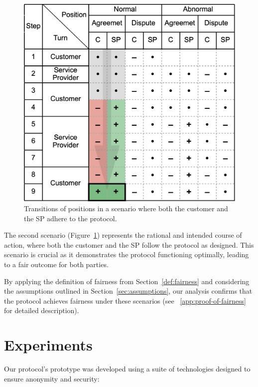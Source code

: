 \documentclass[pdftex,twocolumn,epjc3]{svjour3}
\begin{document}
\begin{figure}[h!]
\includegraphics[width=\linewidth]{rational.png}
\centering
\caption{Transitions of positions in a scenario where both the customer and the SP adhere to the protocol.}
\label{fig:rational}
\end{figure}

The second scenario (Figure~\ref{fig:rational}) represents the rational and intended course of action, where both the customer and the SP follow the protocol as designed. This scenario is crucial as it demonstrates the protocol functioning optimally, leading to a fair outcome for both parties.

By applying the definition of fairness from Section~\ref{def:fairness} and considering the assumptions outlined in Section~\ref{sec:assumptions}, our analysis confirms that the protocol achieves fairness under these scenarios (see ~\ref{app:proof-of-fairness} for detailed description).

\section{Experiments}\label{sec:experiments}


Our protocol's prototype was developed using a suite of technologies designed to ensure anonymity and security:
\end{document}
